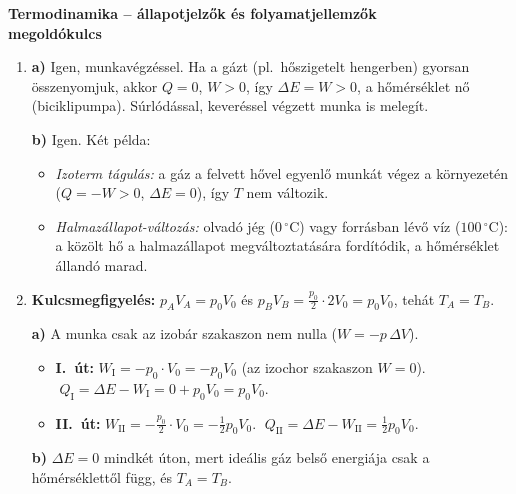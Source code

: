 \documentclass[11pt,a4paper]{article}
\begin{document}
\begin{center}
{\large\bfseries Termodinamika -- állapotjelzők és folyamatjellemzők\\[2pt]
megoldókulcs}

\vspace{6pt}
\end{center}

\vspace{2pt}

\begin{enumerate}[leftmargin=*,label=\textbf{\arabic*.},itemsep=9pt,topsep=0pt,parsep=0pt]

\item \textbf{a)} Igen, munkavégzéssel. Ha a gázt (pl.\ hőszigetelt hengerben) gyorsan
összenyomjuk, akkor $Q = 0$, $W > 0$, így $\Delta E = W > 0$, a hőmérséklet nő
(biciklipumpa). Súrlódással, keveréssel végzett munka is melegít.

\textbf{b)} Igen. Két példa:
\begin{itemize}[nosep,leftmargin=1.5em]
  \item \emph{Izoterm tágulás:} a gáz a felvett hővel egyenlő munkát végez a
    környezetén ($Q = -W > 0$, $\Delta E = 0$), így $T$ nem változik.
  \item \emph{Halmazállapot-változás:} olvadó jég ($0\,^\circ$C) vagy forrásban lévő víz
    ($100\,^\circ$C): a közölt hő a halmazállapot megváltoztatására fordítódik,
    a hőmérséklet állandó marad.
\end{itemize}

\item \textbf{Kulcsmegfigyelés:} $p_AV_A = p_0V_0$ és $p_BV_B = \tfrac{p_0}{2}\cdot 2V_0 =
p_0V_0$, tehát $T_A = T_B$.

\textbf{a)} A munka csak az izobár szakaszon nem nulla ($W = -p\,\Delta V$).
\begin{itemize}[nosep,leftmargin=1.5em]
  \item \textbf{I.~út:} $W_\text{I} = -p_0\cdot V_0 = -p_0V_0$ (az izochor szakaszon
    $W = 0$). $\;Q_\text{I} = \Delta E - W_\text{I} = 0 + p_0V_0 = p_0V_0$.
  \item \textbf{II.~út:} $W_\text{II} = -\tfrac{p_0}{2}\cdot V_0 = -\tfrac12 p_0V_0$.
    $\;Q_\text{II} = \Delta E - W_\text{II} = \tfrac12 p_0V_0$.
\end{itemize}

\textbf{b)} $\Delta E = 0$ mindkét úton, mert ideális gáz belső energiája csak a
hőmérséklettől függ, és $T_A = T_B$.


\end{enumerate}
\end{document}
